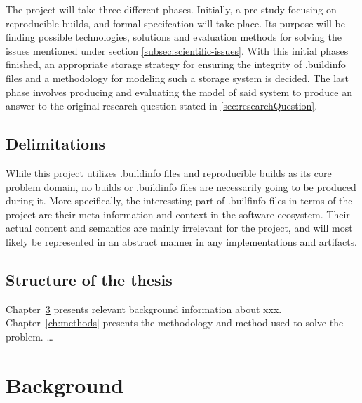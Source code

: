 \documentclass[english, biblatex, digitaloutput]{kththesis}
\begin{document}
The project will take three different phases. Initially, a pre-study focusing on reproducible builds,  and formal specifcation will take place. Its purpose will be finding possible technologies, solutions and evaluation methods for solving the issues mentioned under section \ref{subsec:scientific-issues}. With this initial phases finished, an appropriate storage strategy for ensuring the integrity of .buildinfo files and a methodology for modeling such a storage system is decided. The last phase involves producing and evaluating the model of said system to produce an answer to the original research question stated in \ref{sec:researchQuestion}.

\section{Delimitations}

While this project utilizes .buildinfo files and reproducible builds as its core problem domain, no builds or .buildinfo files are necessarily going to be produced during it. More specifically, the interessting part of .builfinfo files in terms of the project are their meta information and context in the software ecosystem. Their actual content and semantics are mainly irrelevant for the project, and will most likely be represented in an abstract manner in any implementations and artifacts. 

\section{Structure of the thesis}
\label{sec:structure}
Chapter~\ref{ch:background} presents relevant background information about xxx.  Chapter~\ref{ch:methods} presents the methodology and method used to solve the problem. …

\cleardoublepage
\chapter{Background}
\label{ch:background}
\end{document}
